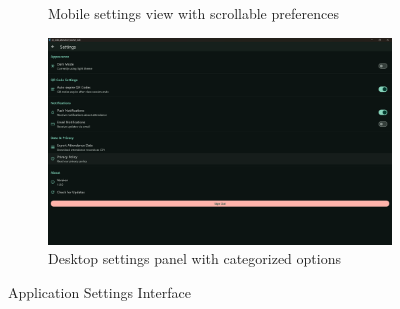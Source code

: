 \begin{figure}[H]
\begin{subfigure}[b]{0.35\textwidth}
        \caption{Mobile settings view with scrollable preferences}
    \end{subfigure}
    \hfill
    \begin{subfigure}[b]{0.35\textwidth}
        \includegraphics[width=\textwidth]{images/rachid/teacher-side-settings-desktop.png}
        \caption{Desktop settings panel with categorized options}
    \end{subfigure}
    \caption{Application Settings Interface}
    \label{fig:settings-interface}
\end{figure}

